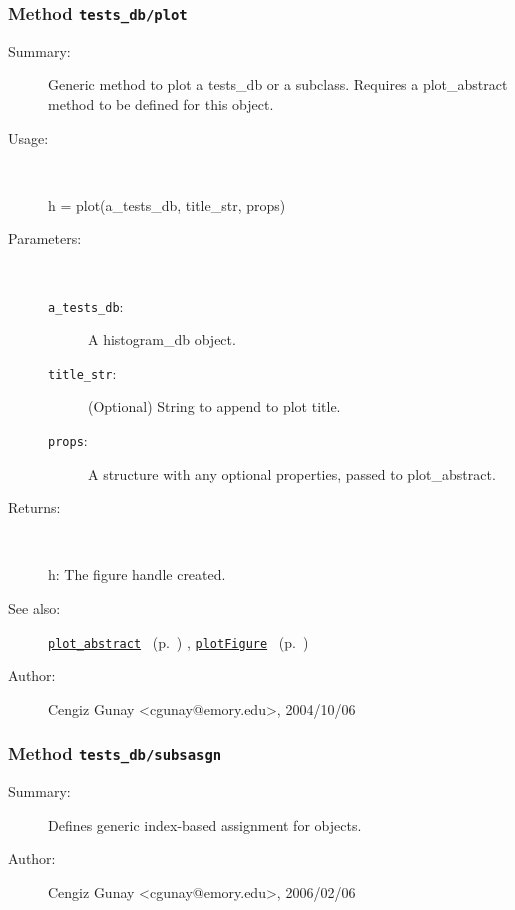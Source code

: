 \subsubsection[Method \texttt{plot}]{Method \texttt{tests\_db/plot}}%
%
\label{ref_tests_db__plot}%
\hypertarget{ref_tests_db__plot}{}%
\begin{description}
\item[Summary:]Generic method to plot a tests\_db or a subclass. Requires a 
	plot\_abstract method to be defined for this object.
%
\item[Usage:]~%
\begin{lyxcode}%
h = plot(a\_tests\_db, title\_str, props)
%
\end{lyxcode}%
%
%
\item[Parameters:]~
\begin{description}%
\item[\texttt{a\_tests\_db}:]
 A histogram\_db object.
\item[\texttt{title\_str}:]
 (Optional) String to append to plot title.
\item[\texttt{props}:]
 A structure with any optional properties, passed to plot\_abstract.
\end{description}%
%
\item[Returns:]~

	h: The figure handle created.
%
%
\item[See also:]%
\hyperlink{ref_plot_abstract}{\texttt{plot\_abstract}}%
\ (p.~\pageref{ref_plot_abstract})%
%
, \hyperlink{ref_plotFigure}{\texttt{plotFigure}}%
\ (p.~\pageref{ref_plotFigure})%
%
%
\item[Author:]%
Cengiz Gunay <cgunay@emory.edu>, 2004/10/06%
\end{description}
\methodline%
\subsubsection[Method \texttt{subsasgn}]{Method \texttt{tests\_db/subsasgn}}%
%
\label{ref_tests_db__subsasgn}%
\hypertarget{ref_tests_db__subsasgn}{}%
\begin{description}
\item[Summary:]Defines generic index-based assignment for objects.
%
%
%
%
%
%
%
\item[Author:]%
Cengiz Gunay <cgunay@emory.edu>, 2006/02/06%
\end{description}
\methodline%
